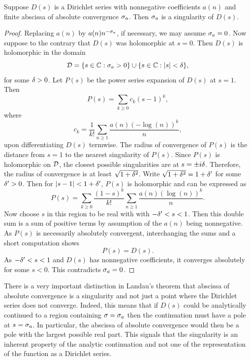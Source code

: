 \documentclass[12pt]{article}
\begin{document}
    \begin{theorem*}
      Suppose \(D(s)\) is a Dirichlet series with nonnegative coefficients \(a(n)\) and finite abscissa of absolute convergence \(\sigma_{a}\). Then \(\sigma_{a}\) is a singularity of \(D(s)\).
    \end{theorem*}
    \begin{proof}
      Replacing \(a(n)\) by \(a(n)n^{-\sigma_{a}}\), if necessary, we may assume \(\sigma_{a} = 0\). Now suppose to the contrary that \(D(s)\) was holomorphic at \(s = 0\). Then \(D(s)\) is holomorphic in the domain
      \[
        \mathcal{D} = \{s \in \mathbb{C}:\sigma_{a} > 0\} \cup \{s \in \mathbb{C}:|s| < \delta\},
      \]
      for some \(\delta > 0\). Let \(P(s)\) be the power series expansion of \(D(s)\) at \(s = 1\). Then
      \[
        P(s) = \sum_{k \ge 0}c_{k}(s-1)^{k},
      \]
      where
      \[
        c_{k} = \frac{1}{k!}\sum_{n \ge 1}\frac{a(n)(-\log(n))^{k}}{n},
      \]
      upon differentiating \(D(s)\) termwise. The radius of convergence of \(P(s)\) is the distance from \(s = 1\) to the nearest singularity of \(P(s)\). Since \(P(s)\) is holomorphic on \(\mathcal{D}\), the closest possible singularities are at \(s = \pm i\delta\). Therefore, the radius of convergence is at least \(\sqrt{1+\delta^{2}}\). Write \(\sqrt{1+\delta^{2}} = 1+\delta'\) for some \(\delta' > 0\). Then for \(|s-1| < 1+\delta'\), \(P(s)\) is holomorphic and can be expressed as
      \[
        P(s) = \sum_{k \ge 0}\frac{(1-s)^{k}}{k!}\sum_{n \ge 1}\frac{a(n)(\log(n))^{k}}{n}.
      \]
      Now choose \(s\) in this region to be real with with \(-\delta' < s < 1\). Then this double sum is a sum of positive terms by assumption of the \(a(n)\) being nonnegative. As \(P(s)\) is necessarily absolutely convergent, interchanging the sums and a short computation shows
      \[
        P(s) = D(s).
      \]
      As \(-\delta' < s < 1\) and \(D(s)\) has nonnegative coefficients, it converges absolutely for some \(s < 0\). This contradicts \(\sigma_{a} = 0\).
    \end{proof}

    There is a very important distinction in Landau's theorem that abscissa of absolute convergence is a singularity and not just a point where the Dirichlet series does not converge. Indeed, this means that if \(D(s)\) could be analytically continued to a region containing \(\sigma = \sigma_{a}\) then the continuation must have a pole at \(s = \sigma_{a}\). In particular, the abscissa of absolute convergence would then be a pole with the largest possible real part. This signals that the singularity is an inherent property of the analytic continuation and not one of the representation of the function as a Dirichlet series.
\end{document}
